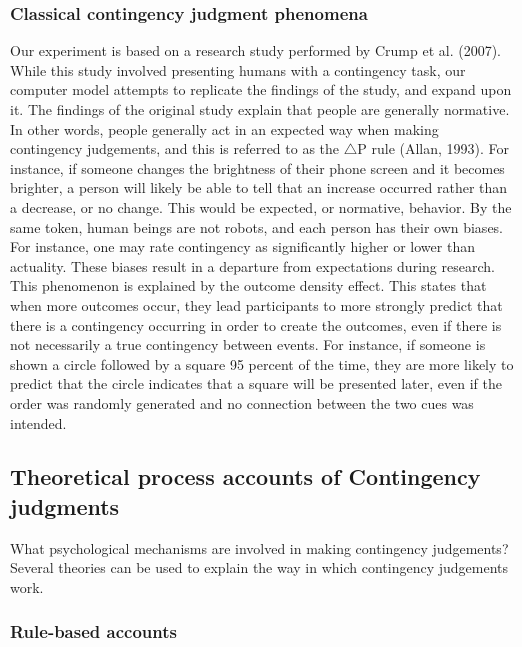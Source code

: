 \documentclass[
  english,
  man,floatsintext]{apa6}
\begin{document}
\hypertarget{classical-contingency-judgment-phenomena}{%
\subsubsection{Classical contingency judgment phenomena}\label{classical-contingency-judgment-phenomena}}

Our experiment is based on a research study performed by Crump et al. (2007). While this study involved presenting humans with a contingency task, our computer model attempts to replicate the findings of the study, and expand upon it. The findings of the original study explain that people are generally normative. In other words, people generally act in an expected way when making contingency judgements, and this is referred to as the \(\triangle\)P rule (Allan, 1993). For instance, if someone changes the brightness of their phone screen and it becomes brighter, a person will likely be able to tell that an increase occurred rather than a decrease, or no change. This would be expected, or normative, behavior. By the same token, human beings are not robots, and each person has their own biases. For instance, one may rate contingency as significantly higher or lower than actuality. These biases result in a departure from expectations during research. This phenomenon is explained by the outcome density effect. This states that when more outcomes occur, they lead participants to more strongly predict that there is a contingency occurring in order to create the outcomes, even if there is not necessarily a true contingency between events. For instance, if someone is shown a circle followed by a square 95 percent of the time, they are more likely to predict that the circle indicates that a square will be presented later, even if the order was randomly generated and no connection between the two cues was intended.

\hypertarget{theoretical-process-accounts-of-contingency-judgments}{%
\subsection{Theoretical process accounts of Contingency judgments}\label{theoretical-process-accounts-of-contingency-judgments}}

What psychological mechanisms are involved in making contingency judgements? Several theories can be used to explain the way in which contingency judgements work.

\hypertarget{rule-based-accounts}{%
\subsubsection{Rule-based accounts}\label{rule-based-accounts}}
\end{document}
